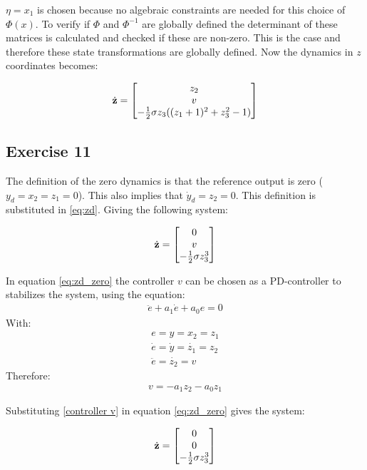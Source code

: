 \documentclass[a4paper,12pt]{article}
\begin{document}
$\eta=x_1$ is chosen because no algebraic constraints are needed for this choice of $\Phi(x)$. To verify if $\Phi$ and $\Phi^{-1}$ are globally defined the determinant of these matrices is calculated and checked if these are non-zero. This is the case and therefore these state transformations are globally defined. Now the dynamics in $z$ coordinates becomes: 

\begin{align}
\dot{{\bf z}}=\begin{bmatrix} z_2 \\ v \\-\frac{1}{2}\sigma z_3 ((z_1+1)^2+z_3^2-1)
\end{bmatrix}
\label{eq:zd}
\end{align}

\subsection{Exercise 11}
The definition of the zero dynamics is that the reference output is zero ($y_d=x_2=z_1=0$). This also implies that $\dot{y}_d=z_2=0$. This definition is substituted in \ref{eq:zd}. Giving the following system:

\begin{align}
\dot{{\bf z}}=\begin{bmatrix} 0 \\ v \\-\frac{1}{2}\sigma z_3^3
\end{bmatrix}
\label{eq:zd_zero}
\end{align}


In equation \ref{eq:zd_zero} the controller $v$ can be chosen as a PD-controller to stabilizes the system, using the equation:
\begin{align}
\ddot{e}+a_1\dot{e}+a_0e=0
\end{align}
With:
\begin{align}
e = y = x_2 = z_1\\
\dot{e} = \dot{y} = \dot{z_1}=z_2\\
\ddot{e} = \dot{z_2} = v
\end{align}
Therefore:
\begin{align}
v=-a_1z_2-a_0z_1
\label{controller v}
\end{align}

Substituting \ref{controller v} in equation \ref{eq:zd_zero} gives the system:

\begin{align}
\dot{{\bf z}}=\begin{bmatrix} 0 \\ 0 \\-\frac{1}{2}\sigma z_3^3
\end{bmatrix}
\label{eq:zd_zero_PD}
\end{align}
\end{document}
